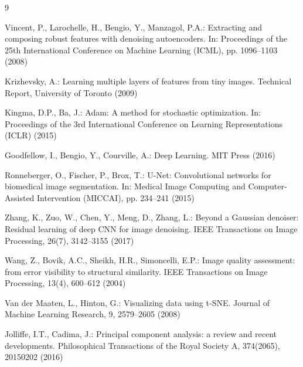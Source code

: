 \documentclass[runningheads]{llncs}
\begin{document}
\begin{thebibliography}{9}

Vincent, P., Larochelle, H., Bengio, Y., Manzagol, P.A.:
Extracting and composing robust features with denoising autoencoders.
In: Proceedings of the 25th International Conference on Machine Learning (ICML), pp. 1096--1103 (2008)

Krizhevsky, A.:
Learning multiple layers of features from tiny images.
Technical Report, University of Toronto (2009)

Kingma, D.P., Ba, J.:
Adam: A method for stochastic optimization.
In: Proceedings of the 3rd International Conference on Learning Representations (ICLR) (2015)

Goodfellow, I., Bengio, Y., Courville, A.:
Deep Learning.
MIT Press (2016)

Ronneberger, O., Fischer, P., Brox, T.:
U-Net: Convolutional networks for biomedical image segmentation.
In: Medical Image Computing and Computer-Assisted Intervention (MICCAI), pp. 234--241 (2015)

Zhang, K., Zuo, W., Chen, Y., Meng, D., Zhang, L.:
Beyond a Gaussian denoiser: Residual learning of deep CNN for image denoising.
IEEE Transactions on Image Processing, 26(7), 3142--3155 (2017)

Wang, Z., Bovik, A.C., Sheikh, H.R., Simoncelli, E.P.:
Image quality assessment: from error visibility to structural similarity.
IEEE Transactions on Image Processing, 13(4), 600--612 (2004)

Van der Maaten, L., Hinton, G.:
Visualizing data using t-SNE.
Journal of Machine Learning Research, 9, 2579--2605 (2008)

Jolliffe, I.T., Cadima, J.:
Principal component analysis: a review and recent developments.
Philosophical Transactions of the Royal Society A, 374(2065), 20150202 (2016)

\end{thebibliography}
\end{document}
